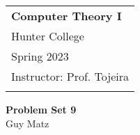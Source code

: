 
%
%
%
%
%
%


\setlength{\parindent}{0pt} %
\onehalfspacing        %


\begin{tabular}{p{15.5cm}}
    {\large \textbf{Computer Theory I}} \\
  Hunter College \\
  Spring 2023  \\
  Instructor: Prof. Tojeira\\
  \hline
  \\
\end{tabular}

\vspace*{0.3cm}        %


\begin{center}
  {\Large \textbf{Problem Set 9}}
  \vspace{2mm}\\
  Guy Matz
\end{center}

\vspace{0.4cm}
